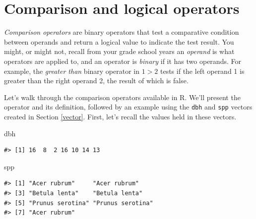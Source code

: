 \documentclass[
  11pt,
]{krantz}
\newenvironment{Shaded}{\begin{snugshade}}{\end{snugshade}}
\newcommand{\NormalTok}[1]{#1}
\theoremstyle{definition}
\theoremstyle{definition}
\theoremstyle{definition}
\theoremstyle{definition}
\theoremstyle{remark}
\begin{document}
\hypertarget{logicalOperators}{%
\section{Comparison and logical operators}\label{logicalOperators}}

\emph{Comparison operators} are binary operators that test a comparative condition between operands and return a logical value to indicate the test result. You might, or might not, recall from your grade school years an \emph{operand} is what operators are applied to, and an operator is \emph{binary} if it has two operands. For example, the \emph{greater than} binary operator in \(1 > 2\) tests if the left operand 1 is greater than the right operand 2, the result of which is false.

Let's walk through the comparison operators available in R. We'll present the operator and its definition, followed by an example using the \texttt{dbh} and \texttt{spp} vectors created in Section \ref{vector}. First, let's recall the values held in these vectors.

\begin{Shaded}
\begin{Highlighting}[]
\NormalTok{dbh}
\end{Highlighting}
\end{Shaded}

\begin{verbatim}
#> [1] 16  8  2 16 10 14 13
\end{verbatim}

\begin{Shaded}
\begin{Highlighting}[]
\NormalTok{spp}
\end{Highlighting}
\end{Shaded}

\begin{verbatim}
#> [1] "Acer rubrum"     "Acer rubrum"    
#> [3] "Betula lenta"    "Betula lenta"   
#> [5] "Prunus serotina" "Prunus serotina"
#> [7] "Acer rubrum"
\end{verbatim}
\end{document}
